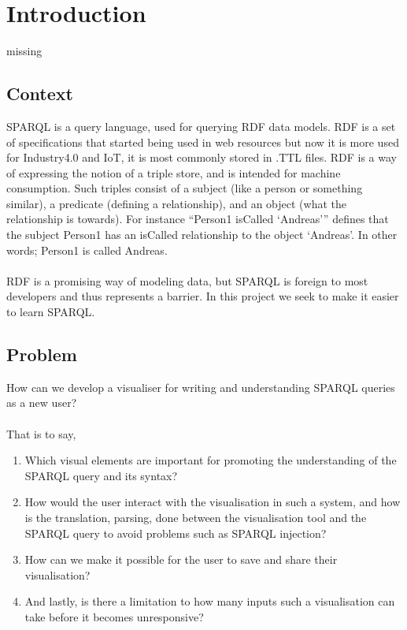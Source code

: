 \chapter{Introduction}
\label{chap:introduction}

{\color{red}missing\\}

\section{Context}

SPARQL is a query language, used for querying RDF data models. RDF is a set of specifications that started being used in web resources\cite{W3SchoolsXMLRDF} but now it is more used for Industry4.0 and IoT, it is most commonly stored in .TTL files. RDF is a way of expressing the notion of a triple store, and is intended for machine consumption. Such triples consist of a subject (like a person or something similar), a predicate (defining a relationship), and an object (what the relationship is towards). For instance “Person1 isCalled ‘Andreas’” defines that the subject Person1 has an isCalled relationship to the object ‘Andreas’. In other words; Person1 is called Andreas.
\\\\
RDF is a promising way of modeling data, but SPARQL is foreign to most developers and thus represents a barrier. In this project we seek to make it easier to learn SPARQL.


\section{Problem}
How can we develop a visualiser for writing and understanding SPARQL queries as a new user?
\\\\
That is to say,
\begin{enumerate}
    \item Which visual elements are important for promoting the understanding of the SPARQL query and its syntax?
    \item How would the user interact with the visualisation in such a system, and how is the translation, parsing, done between the visualisation tool and the SPARQL query to avoid problems such as SPARQL injection?
    \item How can we make it possible for the user to save and share their visualisation? 
    \item And lastly, is there a limitation to how many inputs such a visualisation can take before it becomes unresponsive?
\end{enumerate}



